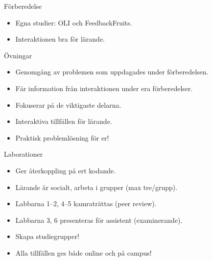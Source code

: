 \begin{frame}
  \begin{block}{Förberedelse}
    \begin{itemize}
      \item Egna studier: OLI och FeedbackFruits.
      \item Interaktionen bra för lärande.
    \end{itemize}
  \end{block}

  \pause

  \begin{block}{Övningar}
    \begin{itemize}
      \item Genomgång av problemen som uppdagades under förberedelsen.
      \item Får information från interaktionen under era förberedelser.
      \item Fokuserar på de viktigaste delarna.
      \item Interaktiva tillfällen för lärande.
      \item Praktisk problemlösning för er!
    \end{itemize}
  \end{block}
\end{frame}

\begin{frame}
  \begin{block}{Laborationer}
    \begin{itemize}
      \item Ger återkoppling på ert kodande.
      \item Lärande är socialt, arbeta i grupper (max tre/grupp).
      \item Labbarna 1--2, 4--5 kamraträttas (peer review).
      \item Labbarna 3, 6 presenteras för assistent (examinerande).
    \end{itemize}
  \end{block}

  \pause

  \begin{remark}
    \begin{itemize}
      \item Skapa studiegrupper!
    \end{itemize}
  \end{remark}
\end{frame}

\begin{frame}
  \begin{remark}
    \begin{itemize}
      \item Alla tillfällen ges både online och på campus!
    \end{itemize}
  \end{remark}
\end{frame}

